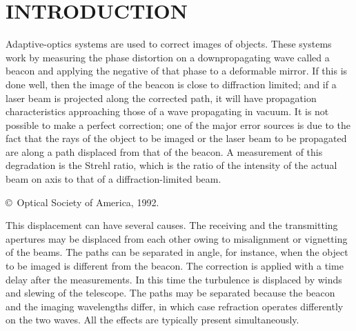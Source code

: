 \maketitle
\begin{abstract}
There are many ways in which the paths of two waves through
turbulence  can become separated, thereby leading to anisoplanatic
effects.  Among  these are a parallel path separation, an angular
separation, one caused  by a time delay, and one that is due to
differential refraction at two  wavelengths.  All these effects can
be treated in the same manner.   Gegenbauer polynomials are used to
obtain an approximation for the  Strehl ratio for these
anisoplanatic effects, yielding a greater range  of applicability
than the Mar\'{e}chal approximation.
\end{abstract}

\section{ INTRODUCTION}
Adaptive-optics systems are  used to correct images of objects.
These systems work by measuring the  phase distortion on a
downpropagating wave called a beacon and applying  the negative of that
phase to a deformable mirror.  If this is done  well, then the
image of the beacon is close to diffraction limited; and  if a
laser beam is projected along the corrected path, it will have
propagation characteristics approaching those of a wave propagating
in  vacuum.  It is not possible to make a perfect correction; one
of the  major error sources is due to the fact  that the rays of
the object to  be imaged or the laser beam to be propagated are
along a path displaced  from that of the beacon.  A measurement of
this degradation is the  Strehl ratio, which is the ratio of the
intensity of the actual beam on  axis to that of a
diffraction-limited beam.

\begin{center}
{\small  \copyright\ Optical Society of America, 1992.}
\end{center}

This displacement can  have several causes.  The receiving and the
transmitting apertures may  be displaced from each other owing to
misalignment or vignetting of the  beams.  The paths can be
separated in angle, for instance, when the  object to be imaged is
different from the beacon.  The correction is  applied with a time
delay after the measurements.  In this time the  turbulence is
displaced by winds and slewing of the telescope.  The  paths may be
separated because the beacon and the imaging wavelengths  differ,
in which case refraction operates differently on the two waves.
All the  effects are typically present simultaneously.

